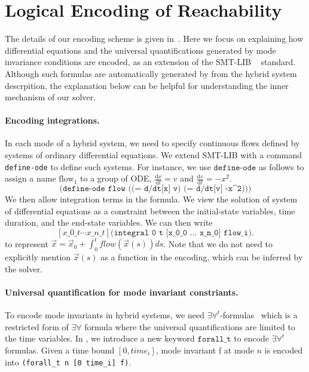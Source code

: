 \section{Logical Encoding of Reachability}


The details of our encoding scheme is given in~\cite{DBLP:journals/corr/GaoKCC14}. 
Here we focus on explaining how differential equations and the universal quantifications 
generated by mode invariance conditions are encoded, as an extension of the SMT-LIB
~\cite{BarST-SMT-10} standard. Although such formulas are automatically generated by \dReach{}
from the hybrid system descrpition, the explanation below can be helpful for 
understanding the inner mechanism of our solver. 

\paragraph{Encoding integrations.}
In each mode of a hybrid system, we need to specify continuous flows defined 
by systems of ordinary differential equations. We extend SMT-LIB with a command
\texttt{define-ode} to define such systems. For instance, we use $\texttt{define-ode}$ as follows to
assign a name $\mathrm{flow_1}$ to a group of ODE,
$\frac{\mathrm{d}x}{\mathrm{d}t} = v$ and
$\frac{\mathrm{d}v}{\mathrm{d}t} = -x^2$.
\[
\texttt{(define-ode flow ((= d/dt[x] v) (= d/dt[v] -x^2)))}
\]
We then allow integration terms in the formula. We view the solution of system of differential equations 
as a constraint between the initial-state variables, time duration, and the end-state variables. We can then write
\[
[x\_0\_t \cdots x\_n\_t]\texttt{(integral 0 t [x\_0\_0 ... x\_n\_0] flow\_i)}.
\]
to represent 
$\vec x = \vec x_0 + \int_0^t flow(\vec x(s))ds$. Note that we do not need to explicitly mention $\vec x(s)$ as a function in the encoding, which can be inferred by the solver. 

\paragraph{Universal quantification for mode invariant constriants.} To encode mode invariants in hybrid systems, we
need $\exists\forall^t$-formulas~\cite{DBLP:conf/fmcad/GaoKC13} which
is a restricted form of $\exists\forall$ formula where the universal
quantifications are limited to the time variables. In \drh{}, we
introduce a new keyword $\texttt{forall\_t}$ to encode
$\exists\forall^t$ formulas. Given a time bound $[0, time_i]$, mode
invariant f at mode $n$ is encoded into \texttt{(forall\_t n [0
  time\_i] f)}.

